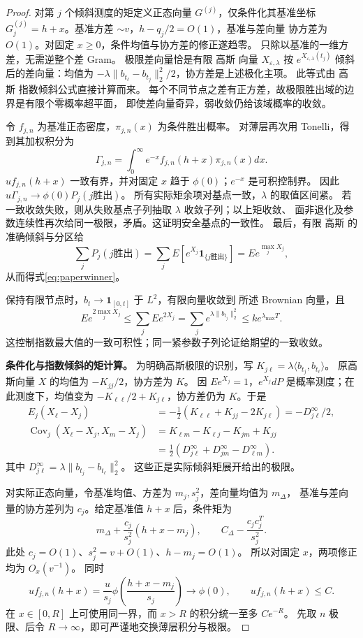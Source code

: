 \documentclass[UTF8,a4paper,11pt,fontset=fandol]{ctexart}
\theoremstyle{remark}
\begin{document}
\begin{proof}
对第 $j$ 个倾斜测度的矩定义正态向量 $G^{(j)}$，仅条件化其基准坐标
$G_j^{(j)}=h+x$。基准方差 $\sim v$，$h-q_j/2=O(1)$，基准与差向量
协方差为 $O(1)$。对固定 $x\ge0$，条件均值与协方差的修正遂趋零。
只除以基准的一维方差，无需逆整个差 Gram。
极限差向量恰是有限 高斯 向量 $X_{\varepsilon,\lambda}$
按 $e^{X_{\varepsilon,\lambda}(t_j)}$ 倾斜后的差向量：均值为
$-\lambda\|b_{t_\ell}-b_{t_j}\|_2^2/2$，协方差是上述极化主项。
此等式由 高斯 指数倾斜公式直接计算而来。
每个不同节点之差有正方差，故极限胜出域的边界是有限个零概率超平面，
即使差向量奇异，弱收敛仍给该域概率的收敛。

令 $f_{j,n}$ 为基准正态密度，$\pi_{j,n}(x)$ 为条件胜出概率。
对薄层再次用 Tonelli，得到其加权积分为
\[
 \Gamma_{j,n}=\int_0^\infty e^{-x}f_{j,n}(h+x)\pi_{j,n}(x)dx.
\]
$uf_{j,n}(h+x)$ 一致有界，并对固定 $x$ 趋于 $\phi(0)$；$e^{-x}$ 是可积控制界。
因此 $u\Gamma_{j,n}\to\phi(0)P_j(j\text{胜出})$。
所有实际矩余项对基点一致，$\lambda$ 的取值区间紧。
若一致收敛失败，则从失败基点子列抽取 $\lambda$ 收敛子列；以上矩收敛、
面非退化及参数连续性再次给同一极限，矛盾。这证明安全基点的一致性。
最后，有限 高斯 的准确倾斜与分区给
\[
 \sum_jP_j(j\text{胜出})
 =\sum_jE[e^{X_j}\mathbf1_{\{j\text{胜出}\}}]=E e^{\max_jX_j},
\]
从而得式\eqref{eq:paperwinner}。

保持有限节点时，$b_t\to\mathbf1_{[0,t]}$ 于 $L^2$，有限向量收敛到
所述 Brownian 向量，且
\[
 E e^{2\max_jX_j}\le\sum_jE e^{2X_j}
 =\sum_je^{\lambda\|b_{t_j}\|_2^2}\le k e^{\lambda_{\max}T}.
\]
这控制指数最大值的一致可积性；同一紧参数子列论证给期望的一致收敛。

\medskip\noindent\textbf{条件化与指数倾斜的矩计算。}
为明确高斯极限的识别，写
$K_{j\ell}=\lambda\langle b_{t_j},b_{t_\ell}\rangle$。
原高斯向量 $X$ 的均值为 $-K_{jj}/2$，协方差为 $K$。
因 $Ee^{X_j}=1$，$e^{X_j}dP$ 是概率测度；在此测度下，均值变为
$-K_{\ell\ell}/2+K_{j\ell}$，协方差仍为 $K$。于是
\begin{align*}
 E_j(X_\ell-X_j)
 &=-\tfrac12(K_{\ell\ell}+K_{jj}-2K_{j\ell})=-D_{j\ell}^{\infty}/2,\\
 \operatorname{Cov}_j(X_\ell-X_j,X_m-X_j)
 &=K_{\ell m}-K_{\ell j}-K_{jm}+K_{jj}\\
 &=\tfrac12(D_{j\ell}^{\infty}+D_{jm}^{\infty}-D_{\ell m}^{\infty}).
\end{align*}
其中 $D_{j\ell}^{\infty}=\lambda\|b_{t_j}-b_{t_\ell}\|_2^2$。
这些正是实际倾斜矩展开给出的极限。

对实际正态向量，令基准均值、方差为 $m_j,s_j^2$，差向量均值为 $m_\Delta$，
基准与差向量的协方差列为 $c_j$。给定基准值 $h+x$ 后，条件矩为
\[
 m_\Delta+\frac{c_j}{s_j^2}(h+x-m_j),\qquad
 C_\Delta-\frac{c_jc_j^T}{s_j^2}.
\]
此处 $c_j=O(1)$、$s_j^2=v+O(1)$、$h-m_j=O(1)$。
所以对固定 $x$，两项修正均为 $O_x(v^{-1})$。
同时
\[
 uf_{j,n}(h+x)=\frac{u}{s_j}\phi\!\left(\frac{h+x-m_j}{s_j}\right)
 \longrightarrow\phi(0),\qquad
 uf_{j,n}(h+x)\le C.
\]
在 $x\in[0,R]$ 上可使用同一界，而 $x>R$ 的积分统一至多 $Ce^{-R}$。
先取 $n$ 极限、后令 $R\to\infty$，即可严谨地交换薄层积分与极限。


\end{proof}
\end{document}
